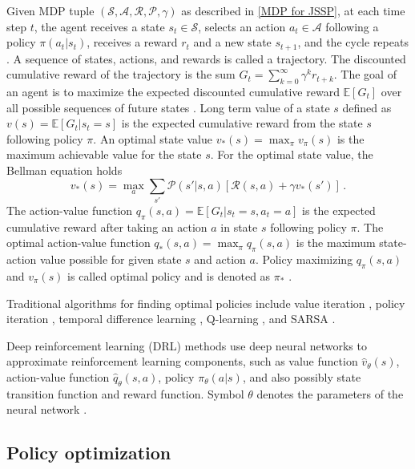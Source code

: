 Given MDP tuple $(\mathcal{S}, \mathcal{A}, \mathcal{R}, \mathcal{P}, \gamma)$ as described in \ref{MDP for JSSP}, at each time step $t$, the agent receives a state $s_t \in \mathcal{S}$, selects an action $a_t \in \mathcal{A}$ following a policy $\pi(a_t|s_t)$, receives a reward $r_t$ and a new state $s_{t+1}$, and the cycle repeats \cite{DBLP:journals/corr/Li17b}. A sequence of states, actions, and rewards is called a trajectory. The discounted cumulative reward of the trajectory is the sum $G_t = \sum_{k=0}^\infty \gamma^k r_{t+k}$. The goal of an agent is to maximize the expected discounted cumulative reward $\mathbb{E}[G_t]$ over all possible sequences of future states \cite{DBLP:journals/corr/Li17b}. Long term value of a state $s$ defined as $v(s) = \mathbb{E}\left [ G_t | s_t = s \right ]$ is the expected cumulative reward from the state $s$ following policy $\pi$. An optimal state value $v_*(s) = \max_\pi v_\pi(s)$ is the maximum achievable value for the state $s$. For the optimal state value, the Bellman equation holds \cite{DBLP:journals/corr/Li17b}
\begin{equation}
	v_*(s) = \max_a \sum_{s'} \mathcal{P} (s' | s,a)\left [ \mathcal{R}(s, a) + \gamma v_*(s') \right ] \, .
\end{equation}
The action-value function $q_\pi(s,a) = \mathbb{E} \left [ G_t | s_t=s, a_t=a\right ]$ is the expected cumulative reward after taking an action $a$ in state $s$ following policy $\pi$. The optimal action-value function $q_* (s,a) = \max_\pi q_\pi(s, a)$ is the maximum state-action value possible for given state $s$ and action $a$. Policy maximizing $q_\pi(s,a)$ and $v_\pi(s)$ is called optimal policy and is denoted as $\pi_*$ \cite{DBLP:journals/corr/Li17b}.
\par
Traditional algorithms for finding optimal policies include value iteration \cite{barto1989learning}, policy iteration \cite{Howard1960DynamicPA}, temporal difference learning \cite{tesauro1995temporal}, Q-learning \cite{watkins1992q}, and SARSA \cite{sarsa}.
\par
Deep reinforcement learning (DRL) methods use deep neural networks to approximate reinforcement learning components, such as value function $\hat{v}_\theta(s)$, action-value function $\hat{q}_\theta(s, a)$, policy $\pi_\theta(a|s)$, and also possibly state transition function and reward function. Symbol $\theta$ denotes the parameters of the neural network \cite{DBLP:journals/corr/Li17b}. 

\subsection{Policy optimization} \label{policy_optimization}

